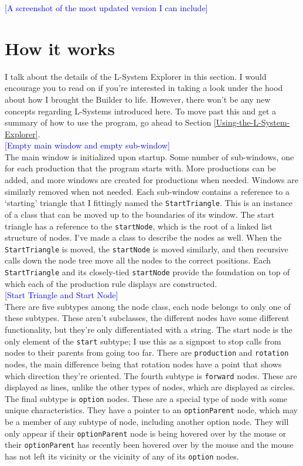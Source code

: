 \documentclass[12pt,twoside]{reedthesis}
\newcommand{\code}[1]{\texttt{#1}}
\begin{document}
	\textcolor{blue}{[A screenshot of the most updated version I can include]}
	
\section{How it works}

	I talk about the details of the L-System Explorer in this section. I would encourage you to read on if you're interested in taking a look under the hood about how I brought the Builder to life. However, there won't be any new concepts regarding L-Systems introduced here. To move past this and get a summary of how to use the program, go ahead to Section \ref{Using-the-L-System-Explorer}.\\
	
	\textcolor{blue}{[Empty main window and empty sub-window]}\\
	
	The main window is initialized upon startup. Some number of sub-windows, one for each production that the program starts with. More productions can be added, and more windows are created for productions when needed. Windows are similarly removed when not needed. Each sub-window contains a reference to a `starting' triangle that I fittingly named the \code{StartTriangle}. This is an instance of a class that can be moved up to the boundaries of its window. The start triangle has a reference to the \code{startNode}, which is the root of a linked list structure of nodes. I've made a class to describe the nodes as well. When the \code{StartTriangle} is moved, the \code{startNode} is moved similarly, and then recursive calls down the node tree move all the nodes to the correct positions. Each \code{StartTriangle} and its closely-tied \code{startNode} provide the foundation on top of which each of the production rule displays are constructed.\\
	
	\textcolor{blue}{[Start Triangle and Start Node]}\\
	
	There are five subtypes among the node class, each node belongs to only one of these subtypes. These aren't subclasses, the different nodes have some different functionality, but they're only differentiated with a string. The start node is the only element of the \code{start} subtype; I use this as a signpost to stop calls from nodes to their parents from going too far. There are \code{production} and \code{rotation} nodes, the main difference being that rotation nodes have a point that shows which direction they're oriented. The fourth subtype is \code{forward} nodes. These are displayed as lines, unlike the other types of nodes, which are displayed as circles. The final subtype is \code{option} nodes. These are a special type of node with some unique characteristics. They have a pointer to an \code{optionParent} node, which may be a member of any subtype of node, including another option node. They will only appear if their \code{optionParent} node is being hovered over by the mouse or their \code{optionParent} has recently been hovered over by the mouse and the mouse has not left its vicinity or the vicinity of any of its \code{option} nodes.\\
	
\end{document}
